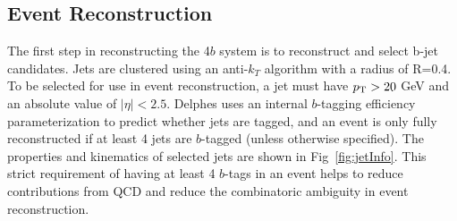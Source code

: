 \subsection{Event Reconstruction}
\label{sec:eventReco}
The first step in reconstructing the 4$b$ system is to reconstruct and select b-jet candidates. Jets are clustered using an anti-$k_T$ algorithm with a radius of R=0.4. To be selected for use in event reconstruction, a jet must have $p_{\text{T}} > 20$ GeV and an absolute value of $\mid\eta\mid < 2.5$. Delphes uses an internal $b$-tagging efficiency parameterization to predict whether jets are tagged, and an event is only fully reconstructed if at least 4 jets are $b$-tagged (unless otherwise specified). The properties and kinematics of selected jets are shown in Fig~\ref{fig:jetInfo}. This strict requirement of having at least 4 $b$-tags in an event helps to reduce contributions from QCD and reduce the combinatoric ambiguity in event reconstruction.

